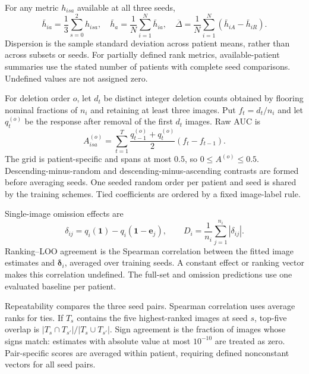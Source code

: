 For any metric $h_{isa}$ available at all three seeds,
\begin{equation}
\bar h_{ia}=\frac13\sum_{s=0}^2h_{isa},\quad
\bar h_a=\frac1N\sum_{i=1}^N\bar h_{ia},\quad
\overline\Delta=\frac1N\sum_{i=1}^N(\bar h_{iA}-\bar h_{iR}).
\end{equation}
Dispersion is the sample standard deviation across patient means, rather than across subsets or seeds. For partially defined rank metrics, available-patient summaries use the stated number of patients with complete seed comparisons. Undefined values are not assigned zero.

For deletion order $o$, let $d_t$ be distinct integer deletion counts obtained by flooring nominal fractions of $n_i$ and retaining at least three images. Put $f_t=d_t/n_i$ and let $q_t^{(o)}$ be the response after removal of the first $d_t$ images. Raw AUC is
\begin{equation}
A_{isa}^{(o)}=
\sum_{t=1}^{T}\frac{q_{t-1}^{(o)}+q_t^{(o)}}2(f_t-f_{t-1}).
\end{equation}
The grid is patient-specific and spans at most $0.5$, so $0\le A^{(o)}\le0.5$. Descending-minus-random and descending-minus-ascending contrasts are formed before averaging seeds. One seeded random order per patient and seed is shared by the training schemes. Tied coefficients are ordered by a fixed image-label rule.

Single-image omission effects are
\begin{equation}
\delta_{ij}=q_i(\boldsymbol1)-q_i(\boldsymbol1-\boldsymbol e_j),\qquad
D_i=\frac1{n_i}\sum_{j=1}^{n_i}|\delta_{ij}|.
\end{equation}
Ranking--LOO agreement is the Spearman correlation between the fitted image estimates and $\boldsymbol\delta_i$, averaged over training seeds. A constant effect or ranking vector makes this correlation undefined. The full-set and omission predictions use one evaluated baseline per patient.

Repeatability compares the three seed pairs. Spearman correlation uses average ranks for ties. If $T_s$ contains the five highest-ranked images at seed $s$, top-five overlap is $|T_s\cap T_{s'}|/|T_s\cup T_{s'}|$. Sign agreement is the fraction of images whose signs match: estimates with absolute value at most $10^{-10}$ are treated as zero. Pair-specific scores are averaged within patient, requiring defined nonconstant vectors for all seed pairs.

